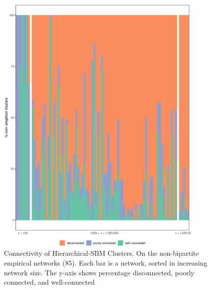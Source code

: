 \documentclass[aps,pre,superscriptaddress]{article}
\begin{document}
\begin{figure}[ht]
	\centering
	\begin{subfloat}
		\centering
		\includegraphics[width=0.9\textwidth]{nested_sbm_conn.eps}
	\end{subfloat}
	\caption{
		Connectivity of Hierarchical-SBM Clusters.
		On the non-bipartite empirical networks (85).
		Each bar is a network, sorted in increasing network size.
		The y-axis shows percentage disconnected, poorly connected, and well-connected
	}
	\label{figs:nested_sbm_conn}
\end{figure}
\end{document}
